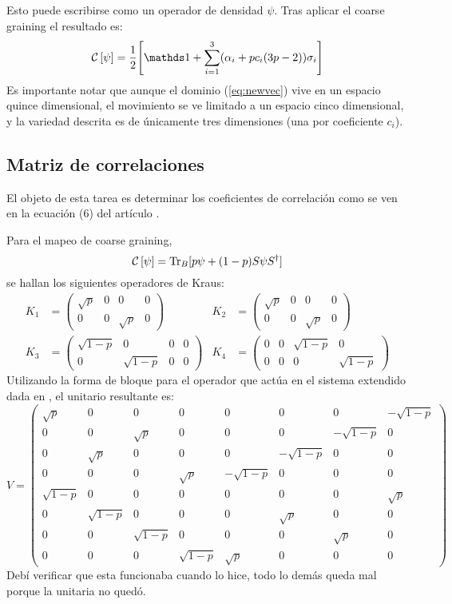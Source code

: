 Esto puede escribirse como un operador de densidad $\psi$. Tras aplicar el coarse graining el resultado es:
\begin{equation}
    \CG{\psi} = \frac{1}{2}\qty[\Id + \sum_{i=1}^3(\alpha_{i}+pc_{i}(3p-2))\sigma_i]\label{eq:newcoarse}
\end{equation}
Es importante notar que aunque el dominio (\ref{eq:newvec}) vive en un espacio quince dimensional, el movimiento se ve limitado a un espacio cinco dimensional, y la variedad descrita es de únicamente tres dimensiones (una por coeficiente $c_{i}$).

\subsection{Matriz de correlaciones}

El objeto de esta tarea es determinar los coeficientes de correlación como se ven en la ecuación (6) del artículo \cite{CGEmergingDynamics}.


Para el mapeo de coarse graining,
\begin{equation}
\mathcal{C}\left[\psi\right]=\Tr_{B}[p\psi+(1-p)S\psi S^{\dag}]
\end{equation}
se hallan los siguientes operadores de Kraus:
\begin{align}
    K_{1}&=\begin{pmatrix} \sqrt{p}&0&0&0\\0&0&\sqrt{p}&0\end{pmatrix} & K_{2}&=\begin{pmatrix} \sqrt{p}&0&0&0\\0&0&\sqrt{p}&0\end{pmatrix} \\ K_{3}&=\begin{pmatrix} \sqrt{1-p}&0&0&0\\0&\sqrt{1-p}&0&0\end{pmatrix} & K_{4}&=\begin{pmatrix} 0&0&\sqrt{1-p}&0\\0&0&0&\sqrt{1-p}\end{pmatrix}
\end{align}
Utilizando la forma de bloque para el operador que actúa en el sistema extendido dada en \cite{Chuang}, el unitario resultante es:
\begin{equation}
V=\begin{pmatrix}
\sqrt{p}&0&0&0&0&0&0&-\sqrt{1 - p}\\
0&0&\sqrt{p}&0&0&0&-\sqrt{1 - p}&0\\
0&\sqrt{p}&0&0&0&-\sqrt{1 - p}&0&0\\
0&0&0&\sqrt{p}&-\sqrt{1 - p}&0&0&0\\
\sqrt{1 - p}&0&0&0&0&0&0&\sqrt{p}\\
0&\sqrt{1 - p}&0&0&0&\sqrt{p}&0&0\\
0&0&\sqrt{1 - p}&0&0&0&\sqrt{p}&0\\
0&0&0&\sqrt{1 - p}&\sqrt{p}&0&0&0 
\end{pmatrix}
\end{equation}
Debí verificar que esta funcionaba cuando lo hice, todo lo demás queda mal porque la unitaria no quedó.

